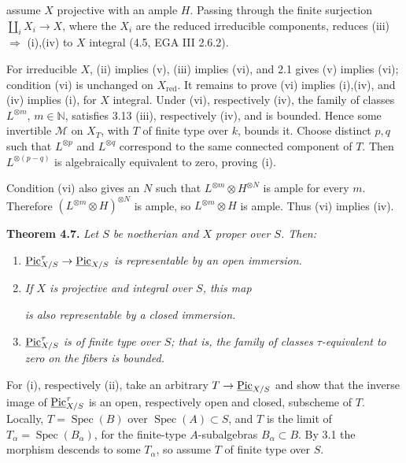 assume \(X\) projective with an ample \(H\). Passing through the finite
surjection \(\coprod_iX_i\to X\), where the \(X_i\) are the reduced
irreducible components, reduces (iii) \(\Rightarrow\) (i),(iv) to \(X\)
integral (4.5, EGA III 2.6.2).

For irreducible \(X\), (ii) implies (v), (iii) implies (vi), and 2.1
gives (v) implies (vi); condition (vi) is unchanged on
\(X_{\mathrm{red}}\). It remains to prove (vi) implies (i),(iv), and
(iv) implies (i), for \(X\) integral. Under (vi), respectively (iv), the
family of classes \(L^{\otimes m}\), \(m\in\mathbb N\), satisfies 3.13
(iii), respectively (iv), and is bounded. Hence some invertible
\(\mathcal M\) on \(X_T\), with \(T\) of finite type over \(k\), bounds
it. Choose distinct \(p,q\) such that \(L^{\otimes p}\) and
\(L^{\otimes q}\) correspond to the same connected component of \(T\).
Then \(L^{\otimes(p-q)}\) is algebraically equivalent to zero, proving
(i).

Condition (vi) also gives an \(N\) such that
\(L^{\otimes m}\otimes H^{\otimes N}\) is ample for every \(m\).
Therefore \((L^{\otimes m}\otimes H)^{\otimes N}\) is ample, so
\(L^{\otimes m}\otimes H\) is ample. Thus (vi) implies (iv).

\textbf{Theorem 4.7.} \emph{Let \(S\) be noetherian and \(X\) proper over
\(S\). Then:}
\begin{enumerate}[label=(\roman*)]
\item \emph{\(\underline{\operatorname{Pic}}^{\tau}_{X/S}\to
\underline{\operatorname{Pic}}_{X/S}\) is representable by an open immersion.}
\item \emph{If \(X\) is projective and integral over \(S\), this map}

\emph{is also representable by a closed immersion.}
\item \emph{\(\underline{\operatorname{Pic}}^{\tau}_{X/S}\) is of finite type over
\(S\); that is, the family of classes \(\tau\)-equivalent to zero on the
fibers is bounded.}
\end{enumerate}

For (i), respectively (ii), take an arbitrary
\(T\to\underline{\operatorname{Pic}}_{X/S}\) and show that the inverse image of
\(\underline{\operatorname{Pic}}^{\tau}_{X/S}\) is an open, respectively open and
closed, subscheme of \(T\). Locally, \(T=\operatorname{Spec}(B)\) over
\(\operatorname{Spec}(A)\subset S\), and \(T\) is the limit of
\(T_\alpha=\operatorname{Spec}(B_\alpha)\), for the finite-type
\(A\)-subalgebras \(B_\alpha\subset B\). By 3.1 the morphism descends to
some \(T_\alpha\), so assume \(T\) of finite type over \(S\).

